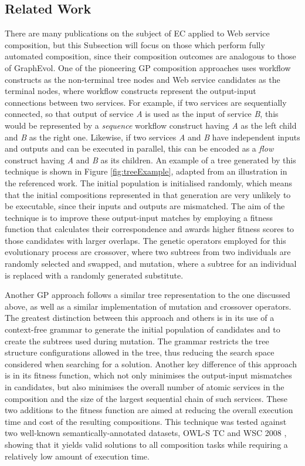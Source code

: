 \documentclass{article}
\begin{document}
\subsection{Related Work}
There are many publications on the subject of EC applied to Web service composition, but this Subsection will focus on those which perform fully automated composition,
since their composition outcomes are analogous to those of GraphEvol. One of the pioneering GP composition approaches \cite{aversano2006genetic} uses workflow constructs as the non-terminal tree nodes and Web service candidates as the terminal nodes, where workflow constructs represent the output-input connections between
two services. For example, if two services are sequentially connected, so that output of service \textit{A} is used as the input of service \textit{B}, this would be represented
by a \textit{sequence} workflow construct having \textit{A} as the left child and \textit{B} as the right one. Likewise, if two services \textit{A} and \textit{B} have independent inputs and outputs and can be executed in parallel, this can be encoded as a \textit{flow} construct having \textit{A} and \textit{B} as its children. An example of a tree generated by this technique is shown in Figure \ref{fig:treeExample}, adapted from an illustration in the referenced work. The initial population is initialised randomly, which means that the initial compositions represented in that generation are very unlikely to be executable, since their inputs and outputs are mismatched. The aim of the technique is to improve these output-input matches by employing a fitness function that calculates their correspondence and awards higher fitness scores to those candidates with larger overlaps. The genetic operators employed for this evolutionary process are crossover, where two subtrees from two individuals are randomly selected and swapped, and mutation, where a subtree for an individual is replaced with a randomly generated substitute.

Another GP approach \cite{rodriguez2010composition} follows a similar tree representation to the one discussed above, as well as a similar implementation of mutation and crossover operators. The greatest distinction between this approach and others is in its use of a context-free grammar to generate the initial population of candidates and to create the subtrees used during mutation. The grammar restricts the tree structure configurations allowed in the tree, thus reducing the search space considered when searching for a solution. Another key difference of this approach is in its fitness function, which not only minimises the output-input mismatches in candidates, but also minimises the overall number of atomic services in the composition and the size of the largest sequential chain of such services. These two additions to the fitness function are aimed at reducing the overall execution time and cost of the resulting compositions. This technique was tested against two well-known semantically-annotated datasets, OWL-S TC \cite{kuster2008opossum} and WSC 2008 \cite{bansal2008wsc}, showing that it yields valid solutions to all composition tasks while requiring a relatively low amount of execution time.
\end{document}
